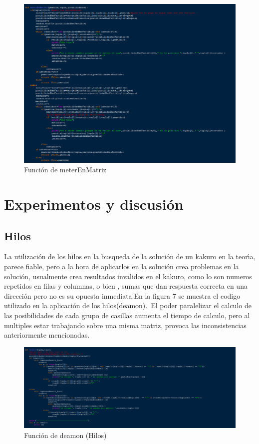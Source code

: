 \documentclass[journal]{IEEEtran}
\begin{document}
\begin{figure}[h] 
	\centering \includegraphics[width=1\columnwidth]{backtrack_parte2.png}
	\caption{
		\label{fig:samplesetup}
		Función de meterEnMatriz
	}
\end{figure}
\section{Experimentos	y	discusión}
\subsection{Hilos}
La utilizaci\'{o}n de los hilos en la busqueda de la soluci\'{o}n de un kakuro en la teor\'{\i}a, parece fiable, pero a la hora de aplicarlos en la soluci\'{o}n crea problemas en la soluci\'{o}n, usualmente crea resultados invalidos en el kakuro, como lo son numeros repetidos en filas y columnas, o bien , sumas que dan respuesta correcta en una direcci\'{o}n pero no es su opuesta inmediata.En la figura 7 se muestra el codigo utilizado en la aplicaci\'{o}n de los hilos(deamon).\ El poder paralelizar el calculo de las posibilidades de cada grupo de casillas aumenta el tiempo de calculo, pero al multiples estar trabajando sobre una misma matriz, provoca las inconsistencias anteriormente mencionadas.
\begin{figure}[h] 
	\centering \includegraphics[width=1\columnwidth]{hilos.png}
	\caption{
		\label{fig:samplesetup}
		Función de deamon (Hilos)
	}
\end{figure}
\end{document}
